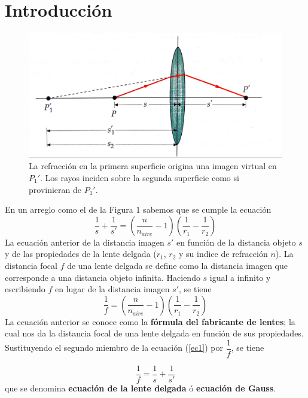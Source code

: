 \documentclass[13,twocolumn,letterpaper]{article}
\begin{document}
\section*{Introducción }
{ 
	\begin{figure}[ht!]
		\centering
		\includegraphics[width=\linewidth]{fig1}
		\caption[Fig 1]{\footnotesize{La refracción en la primera superficie origina una imagen virtual en $P_{1}'$. Los rayos inciden sobre la segunda superficie como si provinieran de $P_{1}'$.}}
		\label{fig:fig-1}
	\end{figure}
	
	En un arreglo como el de la Figura 1 sabemos que se cumple la ecuación 
	\begin{equation}\label{ec1}
		\dfrac{1}{s}+\dfrac{1}{s'}=\left(\dfrac{n}{n_{aire}}-1\right)\left(\dfrac{1}{r_{1}}-\dfrac{1}{r_{2}}\right)
	\end{equation}
	La ecuación anterior de la distancia imagen $s'$ en función de la distancia objeto $s$ y de las propiedades de la lente delgada ($r_{1}$, $r_{2}$ y su indice de refracción $n$). La distancia focal $f$ de una lente delgada se define como la distancia imagen que corresponde a una distancia objeto infinita. Haciendo $s$ igual a infinito y escribiendo $f$ en lugar de la distancia imagen $s'$, se tiene 
	\begin{equation}\label{ec2}
		\dfrac{1}{f}=\left(\dfrac{n}{n_{aire}}-1\right)\left(\dfrac{1}{r_{1}}-\dfrac{1}{r_{2}}\right)
	\end{equation}
	La ecuación anterior se conoce como la \textbf{fórmula del fabricante de lentes}; la cual nos da la distancia focal de una lente delgada en función de sus propiedades. Sustituyendo el segundo miembro de la ecuación (\ref{ec1}) por $\dfrac{1}{f}$, se tiene 
	
	\begin{equation}\label{ec3}
		\dfrac{1}{f}=\dfrac{1}{s}+\dfrac{1}{s'}	
	\end{equation}
	que se denomina \textbf{ecuación de la lente delgada} ó \textbf{ecuación de Gauss}.
}
\end{document}
